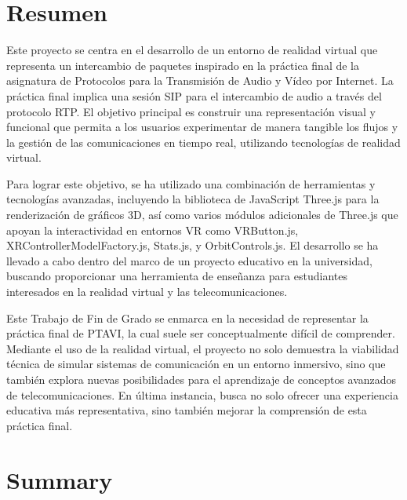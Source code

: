 \documentclass[a4paper, 12pt]{book}
\begin{document}

\chapter*{Resumen}

Este proyecto se centra en el desarrollo de un entorno de realidad virtual que representa un intercambio de paquetes inspirado en la 
práctica final de la asignatura de Protocolos para la Transmisión de Audio y Vídeo por Internet. La práctica final implica una sesión 
SIP para el intercambio de audio a través del protocolo RTP. El objetivo principal es construir una representación visual y funcional 
que permita a los usuarios experimentar de manera tangible los flujos y la gestión de las comunicaciones en tiempo real, utilizando 
tecnologías de realidad virtual.

\bigskip

Para lograr este objetivo, se ha utilizado una combinación de herramientas y tecnologías avanzadas, incluyendo la biblioteca de 
JavaScript Three.js para la renderización de gráficos 3D, así como varios módulos adicionales de Three.js que apoyan la interactividad en 
entornos VR como VRButton.js, XRControllerModelFactory.js, Stats.js, y OrbitControls.js. El desarrollo se ha llevado a cabo dentro del marco 
de un proyecto educativo en la universidad, buscando proporcionar una herramienta de enseñanza para 
estudiantes interesados en la realidad virtual y las telecomunicaciones.

\bigskip

Este Trabajo de Fin de Grado se enmarca en la necesidad de representar la práctica final de PTAVI, la cual suele ser conceptualmente difícil de 
comprender. Mediante el uso de la realidad virtual, el proyecto no solo demuestra la viabilidad técnica de simular sistemas de comunicación 
en un entorno inmersivo, sino que también explora nuevas posibilidades para el aprendizaje de conceptos avanzados de telecomunicaciones. 
En última instancia, busca no solo ofrecer una experiencia educativa más representativa, sino también mejorar la comprensión de esta práctica final.



\chapter*{Summary}
\end{document}
